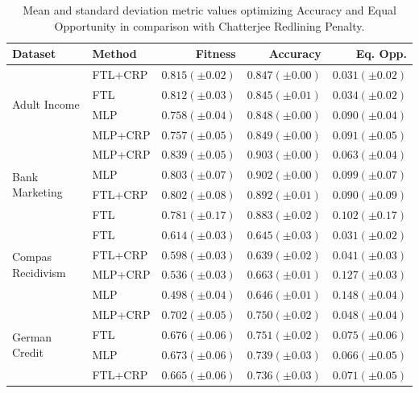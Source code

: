 \begin{table}
    \centering
    \caption{Mean and standard deviation metric values optimizing Accuracy and Equal Opportunity in comparison with Chatterjee Redlining Penalty.}\label{tab:complete_acc_opportunity_crp}
    {\footnotesize \begin{tabular}{llrrr}
    \toprule
    Dataset & Method & Fitness & Accuracy & Eq. Opp. \\
    \midrule
    
    \multirow[t]{4}{*}{Adult Income} & FTL+CRP & $0.815 (\pm0.02)$ & $0.847 (\pm0.00)$ & $0.031 (\pm0.02)$ \\
     & FTL & $0.812 (\pm0.03)$ & $0.845 (\pm0.01)$ & $0.034 (\pm0.02)$ \\
     & MLP & $0.758 (\pm0.04)$ & $0.848 (\pm0.00)$ & $0.090 (\pm0.04)$ \\
     & MLP+CRP & $0.757 (\pm0.05)$ & $0.849 (\pm0.00)$ & $0.091 (\pm0.05)$ \\
    \midrule
    \multirow[t]{4}{*}{Bank Marketing} & MLP+CRP & $0.839 (\pm0.05)$ & $0.903 (\pm0.00)$ & $0.063 (\pm0.04)$ \\
     & MLP & $0.803 (\pm0.07)$ & $0.902 (\pm0.00)$ & $0.099 (\pm0.07)$ \\
     & FTL+CRP & $0.802 (\pm0.08)$ & $0.892 (\pm0.01)$ & $0.090 (\pm0.09)$ \\
     & FTL & $0.781 (\pm0.17)$ & $0.883 (\pm0.02)$ & $0.102 (\pm0.17)$ \\
    \midrule
    \multirow[t]{4}{*}{Compas Recidivism} & FTL & $0.614 (\pm0.03)$ & $0.645 (\pm0.03)$ & $0.031 (\pm0.02)$ \\
     & FTL+CRP & $0.598 (\pm0.03)$ & $0.639 (\pm0.02)$ & $0.041 (\pm0.03)$ \\
     & MLP+CRP & $0.536 (\pm0.03)$ & $0.663 (\pm0.01)$ & $0.127 (\pm0.03)$ \\
     & MLP & $0.498 (\pm0.04)$ & $0.646 (\pm0.01)$ & $0.148 (\pm0.04)$ \\
    \midrule
    \multirow[t]{4}{*}{German Credit} & MLP+CRP & $0.702 (\pm0.05)$ & $0.750 (\pm0.02)$ & $0.048 (\pm0.04)$ \\
     & FTL & $0.676 (\pm0.06)$ & $0.751 (\pm0.02)$ & $0.075 (\pm0.06)$ \\
     & MLP & $0.673 (\pm0.06)$ & $0.739 (\pm0.03)$ & $0.066 (\pm0.05)$ \\
     & FTL+CRP & $0.665 (\pm0.06)$ & $0.736 (\pm0.03)$ & $0.071 (\pm0.05)$ \\
     \bottomrule
\end{tabular} }
\end{table}

